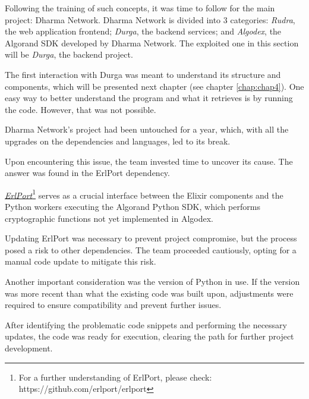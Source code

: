 Following the training of such concepts, it was time to follow for the main project: Dharma Network. \newline
Dharma Network is divided into 3 categories: \textit{Rudra}, the web application frontend; \textit{Durga}, the backend services; and \textit{Algodex}, the Algorand SDK developed by Dharma Network. The exploited one in this section will be \textit{Durga}, the backend project.\newline

The first interaction with Durga was meant to understand its structure and components, which will be presented next chapter (see chapter \ref{chap:chap4}). \newline
One easy way to better understand the program and what it retrieves is by running the code. However, that was not possible.\newline

Dharma Network's project had been untouched for a year, which, with all the upgrades on the dependencies and languages, led to its break.\newline

Upon encountering this issue, the team invested time to uncover its cause. The answer was found in the ErlPort dependency.\newline

\href{https://github.com/erlport/erlport}{\textit{ErlPort}}\footnote{For a further understanding of ErlPort, please check: https://github.com/erlport/erlport} serves as a crucial interface between the Elixir components and the Python workers executing the Algorand Python SDK, which performs cryptographic functions not yet implemented in Algodex.

Updating ErlPort was necessary to prevent project compromise, but the process posed a risk to other dependencies. The team proceeded cautiously, opting for a manual code update to mitigate this risk.\newline

Another important consideration was the version of Python in use. If the version was more recent than what the existing code was built upon, adjustments were required to ensure compatibility and prevent further issues.\newline

After identifying the problematic code snippets and performing the necessary updates, the code was ready for execution, clearing the path for further project development.